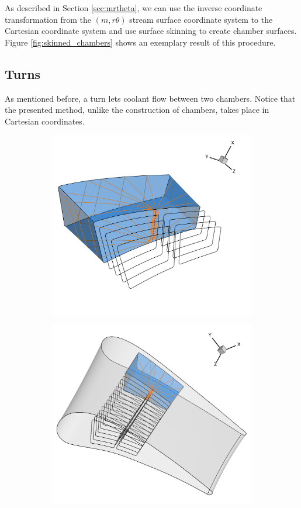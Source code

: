 \documentclass[a4paper, 11pt]{report}
\theoremstyle{definition}
\begin{document}
	As described in Section \ref{sec:mrtheta}, we can use the inverse coordinate transformation from the $(m, r\theta)$ stream surface coordinate system to the Cartesian coordinate system and use surface skinning to create chamber surfaces. Figure \ref{fig:skinned_chambers} shows an exemplary result of this procedure.

\subsection{Turns}
	As mentioned before, a turn lets coolant flow between two chambers. Notice that the presented method, unlike the construction of chambers, takes place in Cartesian coordinates.

	\begin{figure}[H]
		\centering
		\begin{subfigure}{.62\textwidth}
			\includegraphics[width=\textwidth]{../tec/channel/11.png}
		\end{subfigure}
		\begin{subfigure}{.37\textwidth}
			\includegraphics[width=\textwidth]{../tec/channel/12.png}

\end{subfigure}
\end{figure}
\end{document}
